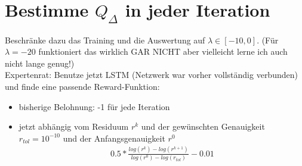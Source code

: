 \documentclass[]{article}
\begin{document}
\section{Bestimme $Q_\Delta$ in jeder Iteration}
Beschränke dazu das Training und die Auswertung auf $\lambda \in [-10,0]$.
(Für $\lambda=-20$ funktioniert das wirklich GAR NICHT aber vielleicht lerne ich auch nicht lange genug!)\\

Expertenrat: Benutze jetzt LSTM (Netzwerk war vorher vollständig verbunden) und finde eine passende Reward-Funktion:
\begin{itemize}
	 \item bisherige Belohnung: -1 für jede Iteration
	 \item jetzt abhängig vom Residuum $r^k$ und der gewünschten Genauigkeit $r_{tol}=10^{-10}$ und der Anfangsgenauigkeit $r^0$ 
	 \begin{align}
	 0.5*\frac{ log(r^k) - log(r^{k+1})}{log(r^0)-log(r_{tol})}-0.01
	 \end{align}
\end{itemize}
\end{document}
